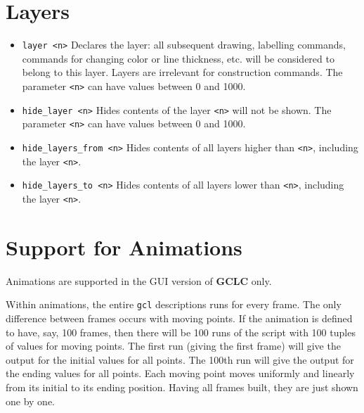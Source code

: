 \documentclass[a4paper]{book}
\newcommand{\gclc}{{\bfseries GCLC}\xspace}
\begin{document}
\section{Layers}
\label{subsec:layers}


\begin{itemize}
\item \verb|layer <n>|
        Declares the layer: all subsequent drawing, labelling commands,
        commands for changing color or line thickness, etc. will be
        considered to belong to this layer. Layers are irrelevant for
        construction commands. The parameter \verb|<n>| can have values
        between 0 and 1000.

\item \verb|hide_layer <n>|
        Hides contents of the layer \verb|<n>| will not be shown.
        The parameter \verb|<n>| can have values between 0 and 1000.

\item \verb|hide_layers_from <n>|
        Hides contents of all layers higher than \verb|<n>|, including
        the layer \verb|<n>|.

\item \verb|hide_layers_to <n>|
        Hides contents of all layers lower than \verb|<n>|, including
        the layer \verb|<n>|.
\end{itemize}




\section{Support for Animations}
\label{subsec:animations}

Animations are supported in the GUI version of \gclc only.

Within animations, the entire \verb|gcl| descriptions runs for
every frame. The only difference between frames occurs with moving
points. If the animation is defined to have, say, 100 frames,
then there will be 100 runs of the script with 100 tuples of
values for moving points. The first run (giving the first frame)
will give the output for the initial values for all points. The 100th
run will give the output for the ending values for all points.
Each moving point moves uniformly and linearly from its initial
to its ending position. Having all frames built, they are just
shown one by one.
\end{document}
